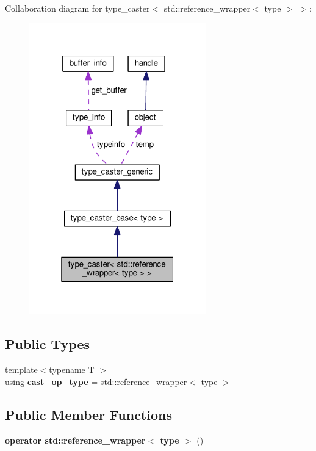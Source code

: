 Collaboration diagram for type\+\_\+caster$<$ std\+:\+:reference\+\_\+wrapper$<$ type $>$ $>$\+:
\nopagebreak
\begin{figure}[H]
\begin{center}
\leavevmode
\includegraphics[width=217pt]{classtype__caster_3_01std_1_1reference__wrapper_3_01type_01_4_01_4__coll__graph}
\end{center}
\end{figure}
\subsection*{Public Types}
\begin{DoxyCompactItemize}
\item 
{\footnotesize template$<$typename T $>$ }\\using {\bfseries cast\+\_\+op\+\_\+type} = std\+::reference\+\_\+wrapper$<$ type $>$\hypertarget{classtype__caster_3_01std_1_1reference__wrapper_3_01type_01_4_01_4_a6685ce2cf35603c77c4830453c900be5}{}\label{classtype__caster_3_01std_1_1reference__wrapper_3_01type_01_4_01_4_a6685ce2cf35603c77c4830453c900be5}

\end{DoxyCompactItemize}
\subsection*{Public Member Functions}
\begin{DoxyCompactItemize}
\item 
{\bfseries operator std\+::reference\+\_\+wrapper$<$ type $>$} ()\hypertarget{classtype__caster_3_01std_1_1reference__wrapper_3_01type_01_4_01_4_a47a6b670b773eac43a50bb678ae41839}{}\label{classtype__caster_3_01std_1_1reference__wrapper_3_01type_01_4_01_4_a47a6b670b773eac43a50bb678ae41839}

\end{DoxyCompactItemize}
